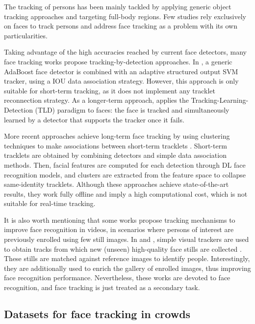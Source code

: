 The tracking of persons has been mainly tackled by applying generic object tracking approaches and targeting full-body regions. Few studies rely exclusively on faces to track persons and address face tracking as a problem with its own particularities. 

Taking advantage of the high accuracies reached by current face detectors, many face tracking works propose tracking-by-detection approaches. In \cite{comaschi2015online}, a generic AdaBoost face detector is combined with an adaptive structured output SVM tracker, using a IOU data association strategy. However, this approach is only suitable for short-term tracking, as it does not implement any tracklet reconnection strategy. 
As a longer-term approach, \cite{kalal2010face} applies the Tracking-Learning-Detection (TLD) paradigm to faces: the face is tracked and simultaneously learned by a detector that supports the tracker once it fails. 

More recent approaches achieve long-term face tracking by using clustering techniques to make associations between short-term tracklets \cite{lin2018offline, zhang2016offline}. Short-term tracklets are obtained by combining detectors and simple data association methods. Then, facial features are computed for each detection through DL face recognition models, and clusters are extracted from the feature space to collapse same-identity tracklets. Although these approaches achieve state-of-the-art results, they work fully offline and imply a high computational cost, which is not suitable for real-time tracking.

It is also worth mentioning that some works propose tracking mechanisms to improve face recognition in videos, in scenarios where persons of interest are previously enrolled using few still images. 
In \cite{dewan2016adaptive} and \cite{zheng2018automatic}, simple visual trackers are used to obtain tracks from which new (unseen) high-quality face stills are collected \cite{dewan2016adaptive}. These stills are matched against reference images to identify people. Interestingly, they are additionally used to enrich the gallery of enrolled images, thus improving face recognition performance. 
Nevertheless, these works are devoted to face recognition, and face tracking is just treated as a secondary task. 

\subsection{Datasets for face tracking in crowds}
\label{sec:public_datasets}

